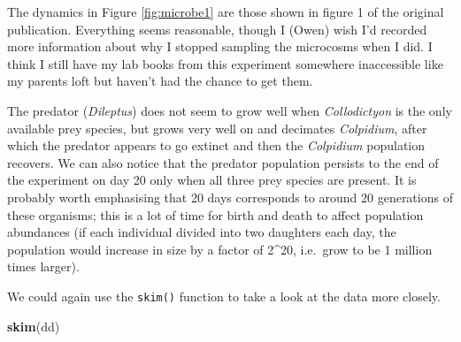 \documentclass[]{book}
\newenvironment{Shaded}{\begin{snugshade}}{\end{snugshade}}
\newcommand{\KeywordTok}[1]{\textcolor[rgb]{0.13,0.29,0.53}{\textbf{#1}}}
\newcommand{\NormalTok}[1]{#1}
\begin{document}
The dynamics in Figure \ref{fig:microbe1} are those shown in figure 1 of the original publication. Everything seems reasonable, though I (Owen) wish I'd recorded more information about why I stopped sampling the microcosms when I did. I think I still have my lab books from this experiment somewhere inaccessible like my parents loft but haven't had the chance to get them.

The predator (\emph{Dileptus}) does not seem to grow well when \emph{Collodictyon} is the only available prey species, but grows very well on and decimates \emph{Colpidium}, after which the predator appears to go extinct and then the \emph{Colpidium} population recovers. We can also notice that the predator population persists to the end of the experiment on day 20 only when all three prey species are present. It is probably worth emphasising that 20 days corresponds to around 20 generations of these organisms; this is a lot of time for birth and death to affect population abundances (if each individual divided into two daughters each day, the population would increase in size by a factor of 2\^{}20, i.e.~grow to be 1 million times larger).

We could again use the \texttt{skim()} function to take a look at the data more closely.

\begin{Shaded}
\begin{Highlighting}[]
\KeywordTok{skim}\NormalTok{(dd)}
\end{Highlighting}
\end{Shaded}
\end{document}

